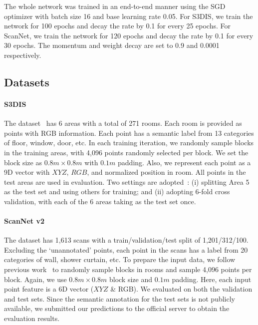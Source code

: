 \documentclass[10pt,twocolumn,letterpaper]{article}
\begin{document}
The whole network was trained in an end-to-end manner using the SGD optimizer with batch size 16 and base learning rate 0.05. For S3DIS, we train the network for 100 epochs and decay the rate by 0.1 for every 25 epochs. For ScanNet, we train the network for 120 epochs and decay the rate by 0.1 for every 30 epochs. The momentum and weight decay are set to 0.9 and 0.0001 respectively. 

\subsection{Datasets}

\paragraph{S3DIS}
The dataset~\cite{s3dis} has 6 areas with a total of 271 rooms.
Each room is provided as points with RGB information.
Each point has a semantic label from 13 categories of floor, window, door, etc.
In each training iteration, we randomly sample blocks in the training areas, with 4,096 points randomly selected per block. We set the block size as $0.8m \times 0.8m$ with $0.1m$ padding.
Also, we represent each point as a 9D vector with $XYZ$, $RGB$, and normalized position in room.
All points in the test areas are used in evaluation.
Two settings are adopted~\cite{segcloud, spg, pointcnn}: (i) splitting Area 5 as the test set and using others for training; and (ii) adopting 6-fold cross validation, with each of the 6 areas taking as the test set once. 

\vspace{-0.12in}
\paragraph{ScanNet v2} 
The dataset has 1,613 scans with a train/validation/test split of 1,201/312/100. Excluding the `unannotated' points, each point in the scans has a label from 20 categories of wall, shower curtain, etc. To prepare the input data, we follow previous work~\cite{pointnet2} to randomly sample blocks in rooms and sample 4,096 points per block.
Again, we use $0.8m \times 0.8m$ block size and $0.1m$ padding.
Here, each input point feature is a 6D vector ($XYZ$ \& RGB).
We evaluated on both the validation and test sets.
Since the semantic annotation for the test sets is not publicly available, we submitted our predictions to the official server to obtain the evaluation results.

\vspace{-0.12in}
\end{document}
